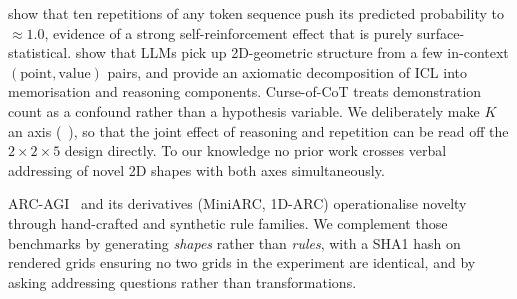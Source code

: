 \citet{yan2024repetitions} show that ten repetitions of any token
sequence push its predicted probability to ${\approx}1.0$, evidence of a
strong self-reinforcement effect that is purely surface-statistical.
\citet{liu2025sparks} show that LLMs pick up 2D-geometric structure
from a few in-context $(\text{point}, \text{value})$ pairs, and
\citet{zheng2024memorization} provide an axiomatic decomposition of
ICL into memorisation and reasoning components. Curse-of-CoT treats
demonstration count as a confound rather than a hypothesis variable.
We deliberately make $K$ an axis (\cf\ ), so that
the joint effect of reasoning and repetition can be read off the
$2{\times}2{\times}5$ design directly. To our knowledge no prior work
crosses verbal addressing of novel 2D shapes with both axes
simultaneously.

ARC-AGI~\citep{chollet2019measure} and its derivatives (MiniARC,
1D-ARC) operationalise novelty through hand-crafted and synthetic
rule families. We complement those benchmarks by generating
\emph{shapes} rather than \emph{rules}, with a SHA1 hash on rendered
grids ensuring no two grids in the experiment are identical, and by
asking addressing questions rather than transformations.
